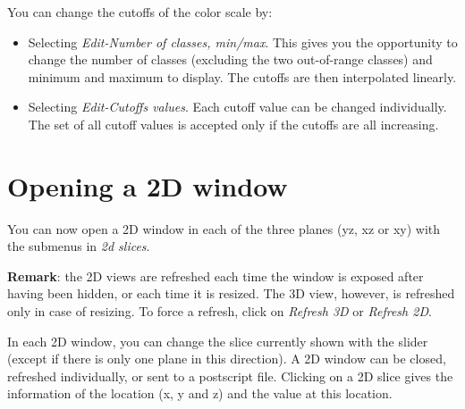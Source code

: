 You can change the cutoffs of the color scale by:
\begin{itemize}
 \item Selecting {\em Edit-Number of classes, min/max}. This gives you the
       opportunity to change the number of classes (excluding the two
       out-of-range classes) and minimum and maximum to display. The
       cutoffs are then interpolated linearly.\\
\vspace{189pt}
 \item Selecting {\em Edit-Cutoffs values}. Each cutoff value can be changed
       individually. The set of all cutoff values is accepted only if the
       cutoffs are all increasing.\\
\vspace{160pt}
\end{itemize}

\section{Opening a 2D window}

You can now open a 2D window in each of the three planes (yz, xz or xy)
with the submenus in {\em 2d slices}.\\
\vspace{358pt}

{\bf Remark}: the 2D views are refreshed each time the window is exposed
after having been hidden, or each time it is resized.
The 3D view, however, is refreshed only in 
case of resizing. To force a refresh, click on {\em Refresh 3D} or
{\em Refresh 2D}.

In each 2D window, you can change the slice currently shown with the slider
(except if there is only one plane in this direction).
A 2D window can be closed, refreshed individually, or sent to a postscript
file. Clicking on a 2D slice gives the information of the location (x, y and z)
and the value at this location.

